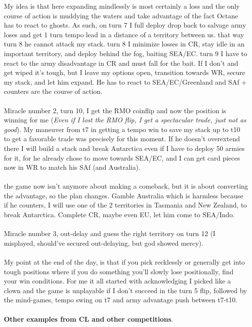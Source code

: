 My idea is that here expanding mindlessly is most certainly a loss and the only course of action is muddying the waters and take advantage of the fact Octane has to react to ghosts. As such, on turn 7 I full deploy drop back to salvage army loses and get 1 turn tempo lead in a distance of a territory between us. that way turn 8 he cannot attack my stack. turn 8 I minimize losses in CR, stay idle in an important territory, and deploy behind the fog, baiting SEA/EC. turn 9 I have to react to the army disadvantage in CR and must fall for the bait. If I don't and get wiped it's tough, but I leave my options open, transition towards WR, secure my stack, and let him expand. He has to react to SEA/EC/Greenland and SAf + counters are the course of action. 
\\
\\
Miracle number 2, turn 10, I get the RMO coinflip and now the position is winning for me (\textit{Even if I lost the RMO flip, I get a spectacular trade, just not as good}). My maneuver from t7 in getting a tempo win to save my stack up to t10 to get a favorable trade was precisely for this moment. If he doesn't overextend there I will build a stack and break Antarctica even if I have to deploy 50 armies for it, for he already chose to move towards SEA/EC, and I can get card pieces now in WR to match his SAf (and Australia).
\\
\\
the game now isn't anymore about making a comeback, but it is about converting the advantage, so the plan changes. Gamble Australia which is harmless because if he counters, I will use one of the 2 territories in Tasmania and New Zealand, to break Antarctica. Complete CR, maybe even EU, let him come to SEA/Indo. 
\\
\\
Miracle number 3, out-delay and guess the right territory on turn 12 (I misplayed, should've secured out-delaying, but god showed mercy). 
\\
\\
My point at the end of the day, is that if you pick recklessly or generally get into tough positions where if you do something you'll slowly lose positionally, find your win conditions. For me it all started with acknowledging I picked like a clown and the game is unplayable if I don't succeed in the turn 5 flip, followed by the mind-games, tempo swing on t7 and army advantage push between t7-t10.
\\
\\
\textbf{Other examples from CL and other competitions}.

